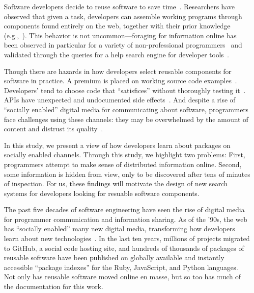 Software developers decide to reuse software to save time~\cite{mili_reusing_1995}.
Researchers have observed that given a task, developers can assemble working programs through components found entirely on the web, together with their prior knowledge (e.g.,~\cite{brandt_two_2009}).
This behavior is not uncommon---foraging for information online has been observed in particular for a variety of non-professional programmers~\cite{brandt_opportunistic_2008} and validated through the queries for a help search engine for developer tools~\cite{brandt_two_2009}.

Though there are hazards in how developers select reusable components for software in practice.
A premium is placed on working source code examples~\cite{nykaza_what_2002}.
Developers' tend to choose code that ``satisfices'' without thoroughly testing it~\cite{brandt_two_2009}.
APIs have unexpected and undocumented side effects~\cite{robillard_field_2011}.
And despite a rise of ``socially enabled'' digital media for communicating about software, programmers face challenges using these channels:
they may be overwhelmed by the amount of content and distrust its quality~\cite{storey_revolution_2014}.

In this study, we present a view of how developers learn about packages on socially enabled channels.
Through this study, we highlight two problems:
First, programmers attempt to make sense of distributed information online.
Second, some information is hidden from view, only to be discovered after tens of minutes of inspection.
For us, these findings will motivate the design of new search systems for developers looking for resuable software components.


The past five decades of software engineering have seen the rise of digital media for programmer communication and information sharing.
As of the '90s, the web has ``socially enabled'' many new digital media, transforming how developers learn about new technologies~\cite{storey_revolution_2014}.
In the last ten years, millions of projects migrated to GitHub, a social code hosting site, and hundreds of thousands of packages of reusable software have been published on globally available and instantly accessible ``package indexes'' for the Ruby, JavaScript, and Python languages.
Not only has reusable software moved online en masse, but so too has much of the documentation for this work.

